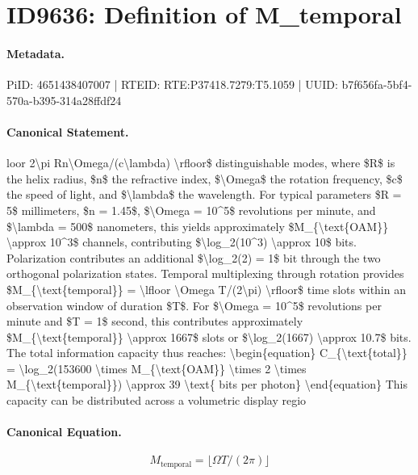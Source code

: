 \section*{ID9636: Definition of M\_temporal}
\paragraph{Metadata.}
PiID: 4651438407007 | RTEID: RTE:P37418.7279:T5.1059 | UUID: b7f656fa-5bf4-570a-b395-314a28ffdf24

\paragraph{Canonical Statement.}
loor 2\textbackslash{}pi Rn\textbackslash{}Omega/(c\textbackslash{}lambda) \textbackslash{}rfloor\$ distinguishable modes, where \$R\$ is the helix radius, \$n\$ the refractive index, \$\textbackslash{}Omega\$ the rotation frequency, \$c\$ the speed of light, and \$\textbackslash{}lambda\$ the wavelength. For typical parameters \$R = 5\$ millimeters, \$n = 1.45\$, \$\textbackslash{}Omega = 10\textasciicircum{}5\$ revolutions per minute, and \$\textbackslash{}lambda = 500\$ nanometers, this yields approximately \$M\_\{\textbackslash{}text\{OAM\}\} \textbackslash{}approx 10\textasciicircum{}3\$ channels, contributing \$\textbackslash{}log\_2(10\textasciicircum{}3) \textbackslash{}approx 10\$ bits. Polarization contributes an additional \$\textbackslash{}log\_2(2) = 1\$ bit through the two orthogonal polarization states. Temporal multiplexing through rotation provides \$M\_\{\textbackslash{}text\{temporal\}\} = \textbackslash{}lfloor \textbackslash{}Omega T/(2\textbackslash{}pi) \textbackslash{}rfloor\$ time slots within an observation window of duration \$T\$. For \$\textbackslash{}Omega = 10\textasciicircum{}5\$ revolutions per minute and \$T = 1\$ second, this contributes approximately \$M\_\{\textbackslash{}text\{temporal\}\} \textbackslash{}approx 1667\$ slots or \$\textbackslash{}log\_2(1667) \textbackslash{}approx 10.7\$ bits. The total information capacity thus reaches: \textbackslash{}begin\{equation\} C\_\{\textbackslash{}text\{total\}\} = \textbackslash{}log\_2(153600 \textbackslash{}times M\_\{\textbackslash{}text\{OAM\}\} \textbackslash{}times 2 \textbackslash{}times M\_\{\textbackslash{}text\{temporal\}\}) \textbackslash{}approx 39 \textbackslash{}text\{ bits per photon\} \textbackslash{}end\{equation\} This capacity can be distributed across a volumetric display regio

\paragraph{Canonical Equation.}
\[
M_{\text{temporal}} = \lfloor \Omega T/(2\pi) \rfloor
\]


